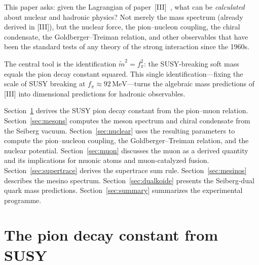 \documentclass[12pt,a4paper]{article}
\newcommand{\MeV}{\,\text{MeV}}
\newcommand{\fpi}{f_\pi}
\begin{document}
This paper asks: given the Lagrangian of paper~[III]~\cite{paperIII},
what can be \emph{calculated} about nuclear and hadronic physics?
Not merely the mass spectrum (already derived in [III]), but the
nuclear force, the pion--nucleon coupling, the chiral condensate, the
Goldberger--Treiman relation, and other observables that have been
the standard tests of any theory of the strong interaction since the
1960s.

The central tool is the identification $\tilde{m}^2 = \fpi^2$: the
SUSY-breaking soft mass equals the pion decay constant squared.  This
single identification---fixing the scale of SUSY breaking at
$\fpi \approx 92\MeV$---turns the algebraic mass predictions of [III]
into dimensional predictions for hadronic observables.

Section~\ref{sec:scale} derives the SUSY pion decay constant from the
pion--muon relation.  Section~\ref{sec:mesons} computes the meson
spectrum and chiral condensate from the Seiberg vacuum.
Section~\ref{sec:nuclear} uses the resulting parameters to compute
the pion--nucleon coupling, the Goldberger--Treiman relation, and the
nuclear potential.  Section~\ref{sec:muon} discusses the muon as a
derived quantity and its implications for muonic atoms and
muon-catalyzed fusion.  Section~\ref{sec:supertrace} derives the
supertrace sum rule.  Section~\ref{sec:mesinos} describes the mesino
spectrum.  Section~\ref{sec:dualkoide} presents the Seiberg-dual
quark mass predictions.  Section~\ref{sec:summary} summarizes the
experimental programme.

\section{The pion decay constant from SUSY}
\label{sec:scale}
\end{document}
